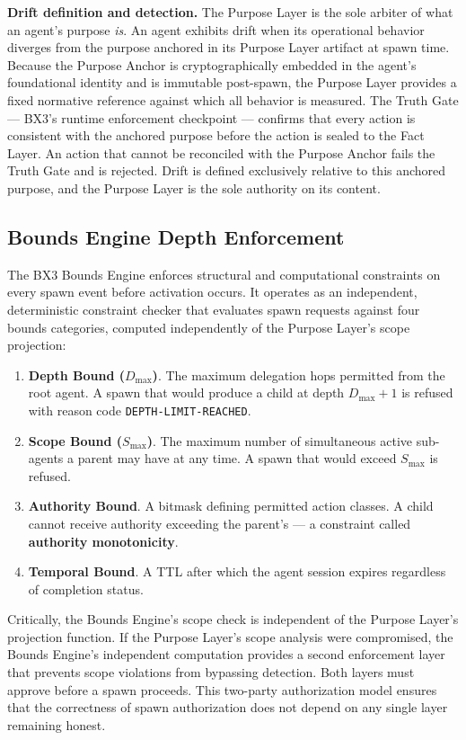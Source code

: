 \textbf{Drift definition and detection.} The Purpose Layer is the sole arbiter of what an agent's purpose \textit{is}. An agent exhibits drift when its operational behavior diverges from the purpose anchored in its Purpose Layer artifact at spawn time. Because the Purpose Anchor is cryptographically embedded in the agent's foundational identity and is immutable post-spawn, the Purpose Layer provides a fixed normative reference against which all behavior is measured. The Truth Gate — BX3's runtime enforcement checkpoint — confirms that every action is consistent with the anchored purpose before the action is sealed to the Fact Layer. An action that cannot be reconciled with the Purpose Anchor fails the Truth Gate and is rejected. Drift is defined exclusively relative to this anchored purpose, and the Purpose Layer is the sole authority on its content.

\subsection{Bounds Engine Depth Enforcement}

The BX3 Bounds Engine enforces structural and computational constraints on every spawn event before activation occurs. It operates as an independent, deterministic constraint checker that evaluates spawn requests against four bounds categories, computed independently of the Purpose Layer's scope projection:

\begin{enumerate}
  \item \textbf{Depth Bound ($D_{\max}$)}. The maximum delegation hops permitted from the root agent. A spawn that would produce a child at depth $D_{\max} + 1$ is refused with reason code \texttt{DEPTH-LIMIT-REACHED}.
  \item \textbf{Scope Bound ($S_{\max}$)}. The maximum number of simultaneous active sub-agents a parent may have at any time. A spawn that would exceed $S_{\max}$ is refused.
  \item \textbf{Authority Bound}. A bitmask defining permitted action classes. A child cannot receive authority exceeding the parent's — a constraint called \textbf{authority monotonicity}.
  \item \textbf{Temporal Bound}. A TTL after which the agent session expires regardless of completion status.
\end{enumerate}

Critically, the Bounds Engine's scope check is independent of the Purpose Layer's projection function. If the Purpose Layer's scope analysis were compromised, the Bounds Engine's independent computation provides a second enforcement layer that prevents scope violations from bypassing detection. Both layers must approve before a spawn proceeds. This two-party authorization model ensures that the correctness of spawn authorization does not depend on any single layer remaining honest.


